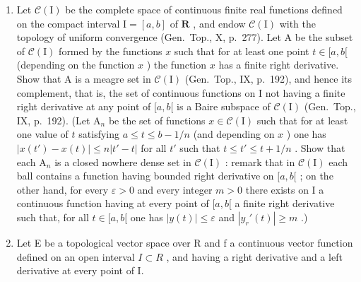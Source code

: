 \begin{enumerate}
\def\labelenumi{\arabic{enumi})}
\setcounter{enumi}{2}
\item
  Let \(\mathcal{C}(\mathrm{I})\) be the complete space of continuous finite real functions defined on the compact interval \(\mathrm{I} = [a,b]\) of \(\mathbf{R}\) , and endow \(\mathcal{C}(\mathrm{I})\) with the topology of uniform convergence (Gen.~Top., X, p.~277). Let A be the subset of \(\mathcal{C}(\mathrm{I})\) formed by the functions \(x\) such that for at least one point \(t\in [a,b[\) (depending on the function \(x\) ) the function \(x\) has a finite right derivative. Show that A is a meagre set in \(\mathcal{C}(\mathrm{I})\) (Gen.~Top., IX, p.~192), and hence its complement, that is, the set of continuous functions on I not having a finite right derivative at any point of \([a,b[\) is a Baire subspace of \(\mathcal{C}(\mathrm{I})\) (Gen.~Top., IX, p.~192). (Let \(\mathrm{A}_n\) be the set of functions \(x\in \mathcal{C}(\mathrm{I})\) such that for at least one value of \(t\) satisfying \(a\leqslant t\leqslant b - 1 / n\) (and depending on \(x\) ) one has \(|x(t') - x(t)|\leqslant n|t' - t|\) for all \(t'\) such that \(t\leqslant t'\leqslant t + 1 / n\) . Show that each \(\mathrm{A}_n\) is a closed nowhere dense set in \(\mathcal{C}(\mathrm{I})\) : remark that in \(\mathcal{C}(\mathrm{I})\) each ball contains a function having bounded right derivative on \([a,b[\) ; on the other hand, for every \(\varepsilon >0\) and every integer \(m > 0\) there exists on I a continuous function having at every point of \([a,b[\) a finite right derivative such that, for all \(t\in [a,b[\) one has \(|y(t)|\leqslant \varepsilon\) and \(|y_r'(t)|\geqslant m\) .)
\item
  Let E be a topological vector space over R and f a continuous vector function defined on an open interval \(I \subset R\) , and having a right derivative and a left derivative at every point of I.
\end{enumerate}


